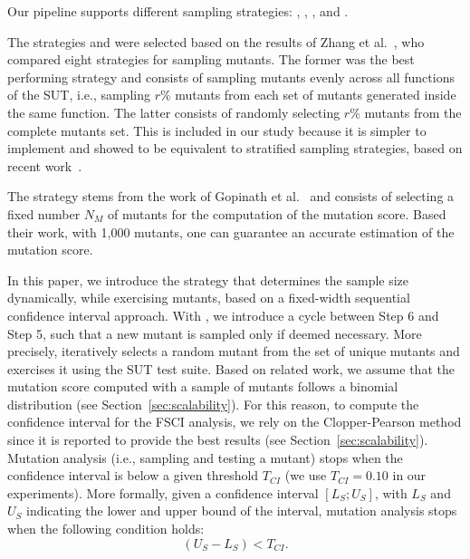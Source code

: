 Our pipeline supports different sampling strategies: , ,  , and . 

The strategies  and  were selected based on the results of Zhang et al.~\cite{zhang2013operator}, who compared eight strategies for sampling mutants. 
The former was the best performing strategy and consists of sampling mutants evenly across all functions of the SUT, i.e., sampling $r\%$ mutants from each set of mutants generated inside the same function.
The latter consists of randomly selecting $r\%$ mutants from the complete mutants set. This is included in our study because it is simpler to implement and showed to be equivalent to stratified sampling strategies, based on recent work~\cite{gopinath2015hard}.

The  strategy stems from the work of Gopinath et al.~\cite{gopinath2015hard} and consists of selecting a fixed number $N_M$ of mutants for the computation of the mutation score. Based their work, with 1,000 mutants, one can guarantee an accurate estimation of the mutation score.

In this paper, we introduce the  strategy that determines the sample size dynamically, while exercising mutants, based on a fixed-width sequential confidence interval approach.
With , we introduce a cycle between Step 6 and Step 5, such that a new mutant is sampled only if deemed necessary.
 More precisely, \APPR iteratively selects a random mutant from the set of unique mutants and exercises it using the SUT test suite. 
Based on related work, we assume that the mutation score computed with a sample of mutants follows a binomial distribution (see Section~\ref{sec:scalability}).
For this reason, to compute the confidence interval for the FSCI analysis, we rely on the Clopper-Pearson method since it is reported to provide the best results (see Section~\ref{sec:scalability}).
Mutation analysis (i.e., sampling and testing a mutant) stops when the confidence interval is below a given threshold $T_{\mathit{CI}}$ (we use $T_{\mathit{CI}}=0.10$ in our experiments). More formally, given a confidence interval 
$[\mathit{L}_{S};\mathit{U}_{S}]$, with $\mathit{L}_{S}$ and $\mathit{U}_{S}$ indicating the lower and upper bound of the interval, mutation analysis stops when the following condition holds:
\begin{equation}
\label{eq:CI:T}
(\mathit{U}_{S}-\mathit{L}_{S})<T_{\mathit{CI}}.
\end{equation}

